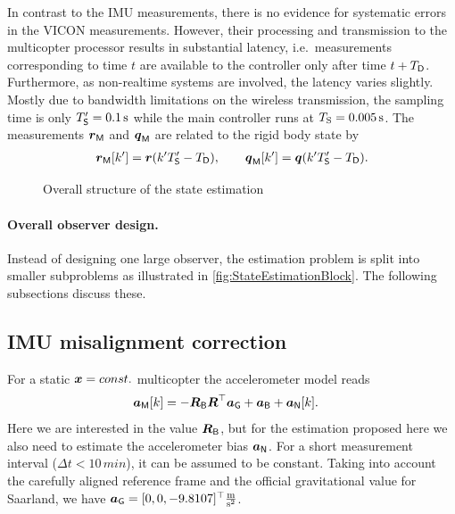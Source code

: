In contrast to the IMU measurements, there is no evidence for systematic errors in the VICON measurements.
However, their processing and transmission to the multicopter processor results in substantial latency, i.e.\ measurements corresponding to time $t$ are available to the controller only after time $t+T_{\mathsf{D}}$.
Furthermore, as non-realtime systems are involved, the latency varies slightly.
Mostly due to bandwidth limitations on the wireless transmission, the sampling time is only $T'_{\mathsf{S}}=0.1\,\text{s}$ while the main controller runs at $T_{\mathrm{S}}=0.005\,\text{s}$.
The measurements $\boldsymbol{r}_{\mathsf{M}}$ and $\boldsymbol{q}_{\mathsf{M}}$ are related to the rigid body state by
\begin{align}
 \boldsymbol{r}_{\mathsf{M}}[k'] = \boldsymbol{r}(k'T'_{\mathsf{S}} - T_{\mathsf{D}}),
\qquad
 \boldsymbol{q}_{\mathsf{M}}[k'] = \boldsymbol{q}(k'T'_{\mathsf{S}} - T_{\mathsf{D}}).
\end{align}

\begin{figure}
 \centering
 
 \caption{Overall structure of the state estimation}
 \label{fig:StateEstimationBlock}
\end{figure}

\paragraph{Overall observer design.}
Instead of designing one large observer, the estimation problem is split into smaller subproblems as illustrated in \autoref{fig:StateEstimationBlock}.
The following subsections discuss these.




\subsection{IMU misalignment correction}
For a static $\boldsymbol{x}=const.$ multicopter the accelerometer model reads
\begin{align}
 \boldsymbol{a}_{\mathsf{M}}[k] &=  -\boldsymbol{R}_{\mathsf{B}} \boldsymbol{R}^\top \boldsymbol{a}_{\mathsf{G}} + \boldsymbol{a}_{\mathsf{B}} + \boldsymbol{a}_{\mathsf{N}}[k].
\end{align} 
Here we are interested in the value $\boldsymbol{R}_{\mathsf{B}}$, but for the estimation proposed here we also need to estimate the accelerometer bias $\boldsymbol{a}_{\mathsf{N}}$.
For a short measurement interval ($\Delta t<10\,\unit{min}$), it can be assumed to be constant.
Taking into account the carefully aligned reference frame and the official gravitational value for Saarland, we have $\boldsymbol{a}_{\mathsf{G}} = [0, 0, -9.8107]^\top \tfrac{\text{m}}{\text{s}^2}$.

